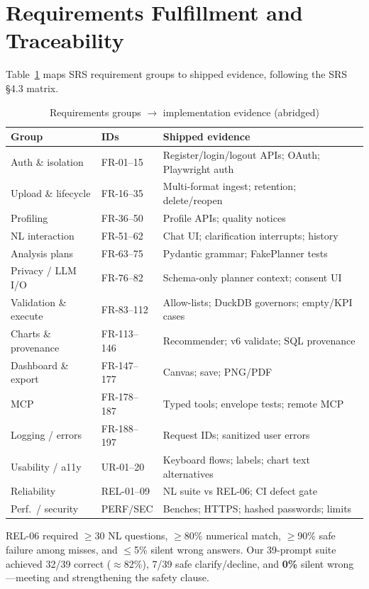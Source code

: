 \documentclass[conference]{IEEEtran}
\begin{document}
\section{Requirements Fulfillment and Traceability}
Table~\ref{tab:trace} maps SRS requirement groups to shipped evidence, following the SRS §4.3 matrix.

\begin{table}[!t]
\caption{Requirements groups $\rightarrow$ implementation evidence (abridged)}
\label{tab:trace}
\centering
\small
\begin{tabular}{p{}p{}p{}}
\toprule
\textbf{Group} & \textbf{IDs} & \textbf{Shipped evidence} \\
\midrule
Auth \& isolation & FR-01--15 & Register/login/logout APIs; OAuth; Playwright auth \\
Upload \& lifecycle & FR-16--35 & Multi-format ingest; retention; delete/reopen \\
Profiling & FR-36--50 & Profile APIs; quality notices \\
NL interaction & FR-51--62 & Chat UI; clarification interrupts; history \\
Analysis plans & FR-63--75 & Pydantic grammar; FakePlanner tests \\
Privacy / LLM I/O & FR-76--82 & Schema-only planner context; consent UI \\
Validation \& execute & FR-83--112 & Allow-lists; DuckDB governors; empty/KPI cases \\
Charts \& provenance & FR-113--146 & Recommender; v6 validate; SQL provenance \\
Dashboard \& export & FR-147--177 & Canvas; save; PNG/PDF \\
MCP & FR-178--187 & Typed tools; envelope tests; remote MCP \\
Logging / errors & FR-188--197 & Request IDs; sanitized user errors \\
Usability / a11y & UR-01--20 & Keyboard flows; labels; chart text alternatives \\
Reliability & REL-01--09 & NL suite vs REL-06; CI defect gate \\
Perf.\ / security & PERF/SEC & Benches; HTTPS; hashed passwords; limits \\
\bottomrule
\end{tabular}
\end{table}

REL-06 required $\geq$30 NL questions, $\geq$80\% numerical match, $\geq$90\% safe failure among misses, and $\leq$5\% silent wrong answers. Our 39-prompt suite achieved 32/39 correct ($\approx$82\%), 7/39 safe clarify/decline, and \textbf{0\%} silent wrong---meeting and strengthening the safety clause.
\end{document}
